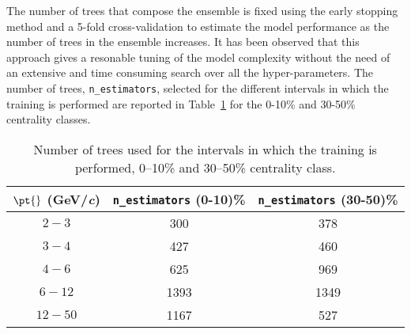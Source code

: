 The number of trees that compose the ensemble is fixed using the early stopping method and a 5-fold cross-validation \cite{stat_learn} 
to estimate the model performance as the number of trees in the ensemble increases. It has been observed that this approach gives a resonable 
tuning of the model complexity without the need of an extensive and time consuming search over all the hyper-parameters. 
The number of trees, \texttt{n\_estimators}, selected for the different \pt{} intervals in which the training is performed are reported in 
Table~\ref{tab:numtree} for the 0-10\% and 30-50\% centrality classes. \\
\begin{table}[h!]
  \begin{center}
  \caption{Number of trees used for the \pt{} intervals in which the training is performed, 0--10\% and 30--50\% centrality class.}
  \label{tab:numtree}
    \begin{tabular}{|c|c|c|}
      \hline
      \textbf{$\mathbf{\pt{}}$ (GeV/\textit{c})} &  \textbf{\texttt{n\_estimators} (0-10)\%} & \textbf{\texttt{n\_estimators} (30-50)\%} \\
      \hline
      \(2 - 3\) & 300 & 378 \\
      \hline
      \(3 - 4\) & 427 & 460 \\
      \hline
      \(4 - 6\) & 625 & 969 \\
      \hline
      \(6 - 12\) & 1393 & 1349 \\
      \hline
      \(12 - 50\) & 1167 & 527 \\
      \hline
    \end{tabular}
  \end{center}
\end{table}

